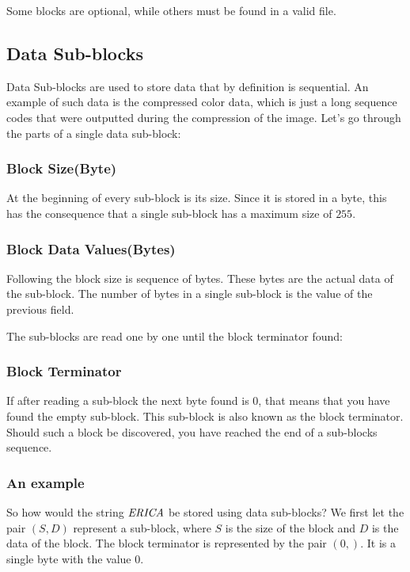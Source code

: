 Some blocks are optional, while others must be found in a valid \gif
file.

\subsection{Data Sub-blocks}
\label{sec:gif-data-sub-blocks}

Data Sub-blocks are used to store data that by definition is
sequential. An example of such data is the compressed color data,
which is just a long sequence codes that were outputted during the
compression of the image. Let's go through the parts of a single data
sub-block:

\subsubsection*{Block Size(Byte)}

At the beginning of every sub-block is its size. Since it is stored in
a byte, this has the consequence that a single sub-block has a maximum
size of $255$.

\subsubsection*{Block Data Values(Bytes)}

Following the block size is sequence of bytes. These bytes are the
actual data of the sub-block. The number of bytes in a single
sub-block is the value of the previous field.

The sub-blocks are read one by one until the block terminator found:

\subsubsection{Block Terminator}

If after reading a sub-block the next byte found is 0, that means
that you have found the empty sub-block. This sub-block is also
known as the block terminator. Should such a block be discovered, you
have reached the end of a sub-blocks sequence.

\subsubsection{An example}

So how would the string $\mathit{ERICA}$ be stored using data sub-blocks? We
first let the pair $(S,D)$ represent a sub-block, where $S$ is the
size of the block and $D$ is the data of the block. The block
terminator is represented by the pair $(0,)$. It is a single byte with
the value $0$.

